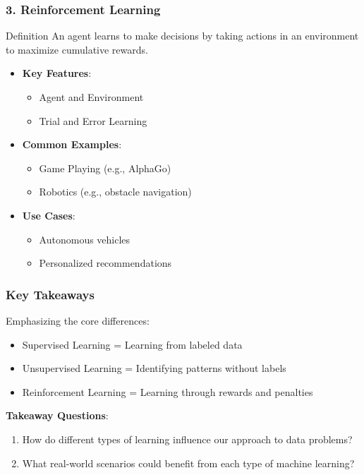 \documentclass[aspectratio=169]{beamer}
\begin{document}
\begin{frame}[fragile]
    \frametitle{3. Reinforcement Learning}
    \begin{block}{Definition}
        An agent learns to make decisions by taking actions in an environment to maximize cumulative rewards.
    \end{block}

    \begin{itemize}
        \item \textbf{Key Features}:
            \begin{itemize}
                \item Agent and Environment
                \item Trial and Error Learning
            \end{itemize}

        \item \textbf{Common Examples}:
            \begin{itemize}
                \item Game Playing (e.g., AlphaGo)
                \item Robotics (e.g., obstacle navigation)
            \end{itemize}

        \item \textbf{Use Cases}:
            \begin{itemize}
                \item Autonomous vehicles
                \item Personalized recommendations
            \end{itemize}
    \end{itemize}
\end{frame}

\begin{frame}[fragile]
    \frametitle{Key Takeaways}
    Emphasizing the core differences:
    \begin{itemize}
        \item Supervised Learning = Learning from labeled data
        \item Unsupervised Learning = Identifying patterns without labels
        \item Reinforcement Learning = Learning through rewards and penalties
    \end{itemize}

    \textbf{Takeaway Questions}:
    \begin{enumerate}
        \item How do different types of learning influence our approach to data problems?
        \item What real-world scenarios could benefit from each type of machine learning?
    \end{enumerate}
\end{frame}
\end{document}
